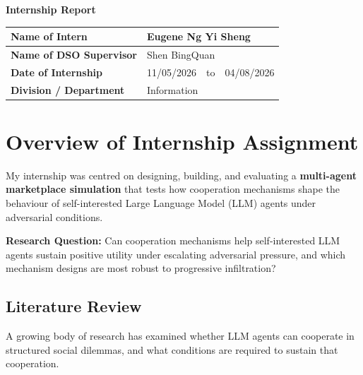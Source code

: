 \documentclass[12pt,a4paper]{article}
\begin{document}

\begin{center}
    {\LARGE\bfseries\color{black} Internship Report}
\end{center}

\vspace{1em}

\renewcommand{\arraystretch}{1.8}
\begin{tabular}{|m{5.5cm}|m{9.5cm}|}
\hline
\textbf{\color{black}Name of Intern}          & Eugene Ng Yi Sheng \\
\hline
\textbf{\color{black}Name of DSO Supervisor}  & Shen BingQuan \\
\hline
\textbf{\color{black}Date of Internship}       & 11/05/2026\ \ to\ \ 04/08/2026 \\
\hline
\textbf{\color{black}Division / Department}    & Information \\
\hline
\end{tabular}

\vspace{2em}

\section{Overview of Internship Assignment}

My internship was centred on designing, building, and evaluating a \textbf{multi-agent marketplace simulation} that tests how cooperation mechanisms shape the behaviour of self-interested Large Language Model (LLM) agents under adversarial conditions.

\medskip
\noindent\textbf{Research Question:} Can cooperation mechanisms help self-interested LLM agents sustain positive utility under escalating adversarial pressure, and which mechanism designs are most robust to progressive infiltration?

\subsection*{Literature Review}

A growing body of research has examined whether LLM agents can cooperate in structured social dilemmas, and what conditions are required to sustain that cooperation.
\end{document}
